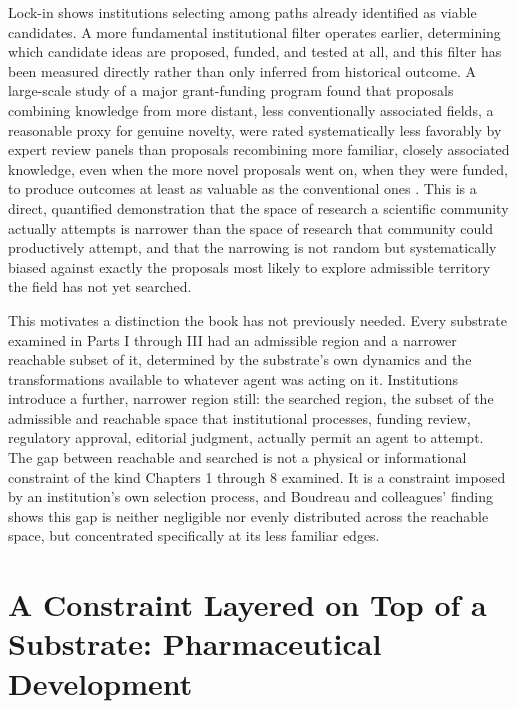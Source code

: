 \documentclass[11pt]{book}
\begin{document}
Lock-in shows institutions selecting among paths already identified as viable candidates. A more fundamental institutional filter operates earlier, determining which candidate ideas are proposed, funded, and tested at all, and this filter has been measured directly rather than only inferred from historical outcome. A large-scale study of a major grant-funding program found that proposals combining knowledge from more distant, less conventionally associated fields, a reasonable proxy for genuine novelty, were rated systematically less favorably by expert review panels than proposals recombining more familiar, closely associated knowledge, even when the more novel proposals went on, when they were funded, to produce outcomes at least as valuable as the conventional ones \cite{boudreau2016}. This is a direct, quantified demonstration that the space of research a scientific community actually attempts is narrower than the space of research that community could productively attempt, and that the narrowing is not random but systematically biased against exactly the proposals most likely to explore admissible territory the field has not yet searched.

This motivates a distinction the book has not previously needed. Every substrate examined in Parts I through III had an admissible region and a narrower reachable subset of it, determined by the substrate's own dynamics and the transformations available to whatever agent was acting on it. Institutions introduce a further, narrower region still: the searched region, the subset of the admissible and reachable space that institutional processes, funding review, regulatory approval, editorial judgment, actually permit an agent to attempt. The gap between reachable and searched is not a physical or informational constraint of the kind Chapters 1 through 8 examined. It is a constraint imposed by an institution's own selection process, and Boudreau and colleagues' finding shows this gap is neither negligible nor evenly distributed across the reachable space, but concentrated specifically at its less familiar edges.

\section{A Constraint Layered on Top of a Substrate: Pharmaceutical Development}
\end{document}
